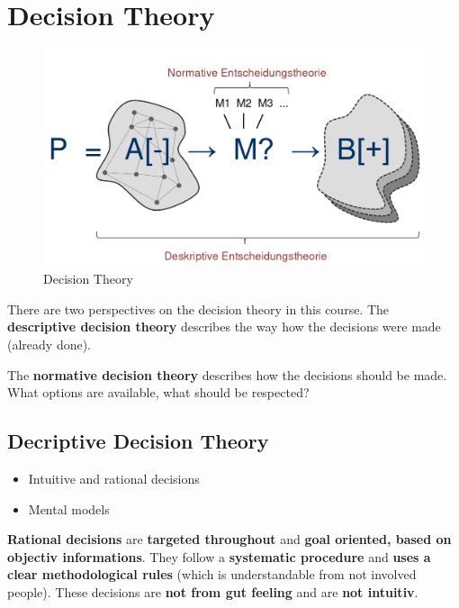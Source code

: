 \hypertarget{decision-theory}{%
\section{Decision Theory}\label{decision-theory}}

\begin{figure}
\centering
\includegraphics{figures/decisionTheory.png}
\caption{Decision Theory}
\end{figure}

There are two perspectives on the decision theory in this course. The
\textbf{descriptive decision theory} describes the way how the decisions
were made (already done).

The \textbf{normative decision theory} describes how the decisions
should be made. What options are available, what should be respected?

\hypertarget{decriptive-decision-theory}{%
\subsection{Decriptive Decision
Theory}\label{decriptive-decision-theory}}

\begin{itemize}
\tightlist
\item
  Intuitive and rational decisions
\item
  Mental models
\end{itemize}

\textbf{Rational decisions} are \textbf{targeted throughout} and
\textbf{goal oriented, based on objectiv informations}. They follow a
\textbf{systematic procedure} and \textbf{uses a clear methodological
rules} (which is understandable from not involved people). These
decisions are \textbf{not from gut feeling} and are \textbf{not
intuitiv}.

